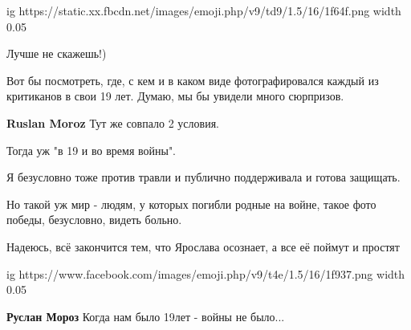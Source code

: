 \begin{itemize}
\ifcmt
  ig https://static.xx.fbcdn.net/images/emoji.php/v9/td9/1.5/16/1f64f.png
  width 0.05
\fi


 

Лучше не скажешь!)

 

Вот бы посмотреть, где, с кем и в каком виде фотографировался каждый из
критиканов в свои 19 лет. Думаю, мы бы увидели много сюрпризов.

\begin{itemize}
 
\textbf{Ruslan Moroz}
Тут же совпало 2 условия.

Тогда уж "в 19 и во время войны".

Я безусловно тоже против травли и публично поддерживала и готова защищать.

Но такой уж мир - людям, у которых погибли родные на войне, такое фото победы,
безусловно, видеть больно.

Надеюсь, всё закончится тем, что Ярослава осознает, а все её поймут и простят

\ifcmt
  ig https://www.facebook.com/images/emoji.php/v9/t4e/1.5/16/1f937.png
  width 0.05
\fi


 
\textbf{Руслан Мороз}
Когда нам было 19лет - войны не было...

 

\end{itemize}
\end{itemize}
